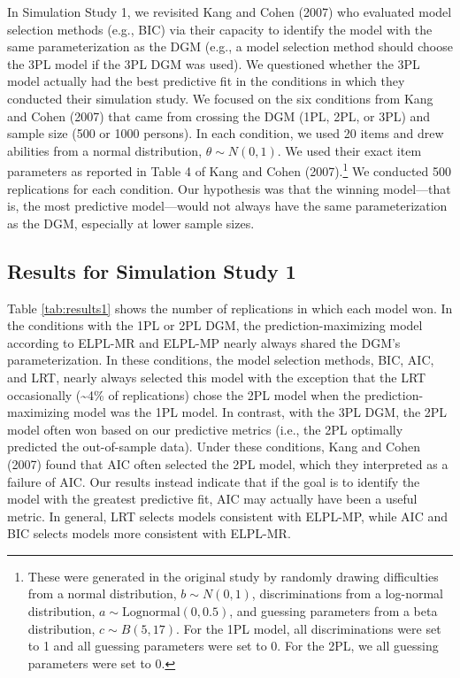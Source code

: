 \documentclass[
  english,
  man,floatsintext]{apa7}
\begin{document}
In Simulation Study 1, we revisited Kang and Cohen (2007) who evaluated model selection methods (e.g., BIC) via their capacity to identify the model with the same parameterization as the DGM (e.g., a model selection method should choose the 3PL model if the 3PL DGM was used). We questioned whether the 3PL model actually had the best predictive fit in the conditions in which they conducted their simulation study. We focused on the six conditions from Kang and Cohen (2007) that came from crossing the DGM (1PL, 2PL, or 3PL) and sample size (500 or 1000 persons). In each condition, we used 20 items and drew abilities from a normal distribution, \(\theta \sim N(0, 1)\). We used their exact item parameters as reported in Table 4 of Kang and Cohen (2007).\footnote{These were generated in the original study by randomly drawing difficulties from a normal distribution, \(b \sim N(0, 1)\), discriminations from a log-normal distribution, \(a \sim \text{Lognormal}(0, 0.5)\), and guessing parameters from a beta distribution, \(c \sim B(5, 17)\). For the 1PL model, all discriminations were set to 1 and all guessing parameters were set to 0. For the 2PL, we all guessing parameters were set to 0.} We conducted 500 replications for each condition. Our hypothesis was that the winning model---that is, the most predictive model---would not always have the same parameterization as the DGM, especially at lower sample sizes.

\hypertarget{results-for-simulation-study-1}{%
\subsection{Results for Simulation Study 1}\label{results-for-simulation-study-1}}

Table \ref{tab:results1} shows the number of replications in which each model won. In the conditions with the 1PL or 2PL DGM, the prediction-maximizing model according to ELPL-MR and ELPL-MP nearly always shared the DGM's parameterization. In these conditions, the model selection methods, BIC, AIC, and LRT, nearly always selected this model with the exception that the LRT occasionally (\textasciitilde4\% of replications) chose the 2PL model when the prediction-maximizing model was the 1PL model. In contrast, with the 3PL DGM, the 2PL model often won based on our predictive metrics (i.e., the 2PL optimally predicted the out-of-sample data). Under these conditions, Kang and Cohen (2007) found that AIC often selected the 2PL model, which they interpreted as a failure of AIC. Our results instead indicate that if the goal is to identify the model with the greatest predictive fit, AIC may actually have been a useful metric. In general, LRT selects models consistent with ELPL-MP, while AIC and BIC selects models more consistent with ELPL-MR.
\end{document}
